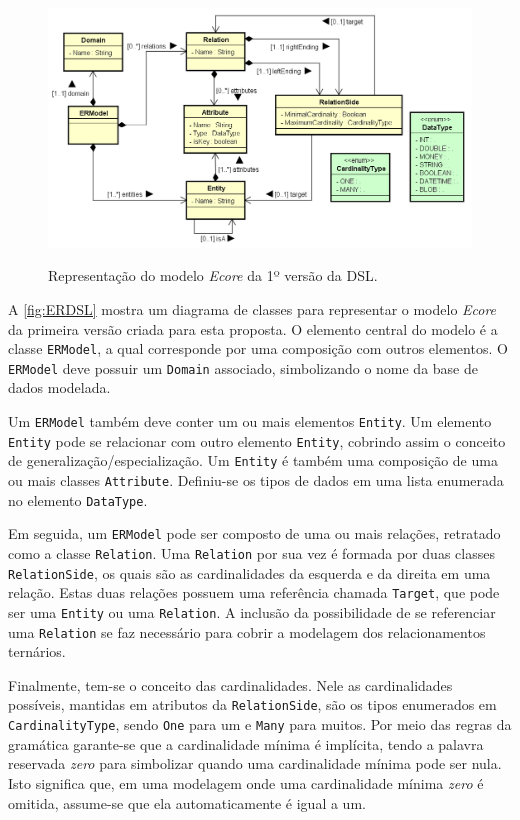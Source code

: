 \begin{figure}[!htb]
    \centering
    \caption{Representação do modelo \textit{Ecore} da 1º versão da DSL.}
    \includegraphics[width=1\textwidth]{img/erDslClassDiagram.png}
    \label{fig:ERDSL}
\end{figure}

A \autoref{fig:ERDSL} mostra um diagrama de classes para representar o modelo \textit{Ecore} da primeira versão criada para esta proposta. 
O elemento central do modelo é a classe \texttt{ERModel}, a qual corresponde por uma composição com outros elementos. 
O \texttt{ERModel} deve possuir um \texttt{Domain} associado, simbolizando o nome da base de dados modelada. 

Um \texttt{ERModel} também deve conter um ou mais elementos \texttt{Entity}. 
Um elemento \texttt{Entity} pode se relacionar com outro elemento \texttt{Entity}, cobrindo assim o conceito de generalização/especialização. 
Um \texttt{Entity} é também uma composição de uma ou mais classes \texttt{Attribute}. 
Definiu-se os tipos de dados em uma lista enumerada no elemento \texttt{DataType}.

Em seguida, um \texttt{ERModel} pode ser composto de uma ou mais relações, retratado como a classe \texttt{Relation}. 
Uma \texttt{Relation} por sua vez é formada por duas classes \texttt{RelationSide}, os quais são as cardinalidades da esquerda e da direita em uma relação. 
Estas duas relações possuem uma referência chamada \texttt{Target}, que pode ser uma \texttt{Entity} ou uma \texttt{Relation}. 
A inclusão da possibilidade de se referenciar uma \texttt{Relation} se faz necessário para cobrir a modelagem dos relacionamentos ternários.

Finalmente, tem-se o conceito das cardinalidades. 
Nele as cardinalidades possíveis, mantidas em atributos da \texttt{RelationSide}, são os tipos enumerados em \texttt{CardinalityType}, sendo \texttt{One} para um e \texttt{Many} para muitos. 
Por meio das regras da gramática garante-se que a cardinalidade mínima é implícita, tendo a palavra reservada \textit{zero} para simbolizar quando uma cardinalidade mínima pode ser nula. 
Isto significa que, em uma modelagem onde uma cardinalidade mínima \textit{zero} é omitida, assume-se que ela automaticamente é igual a um.

